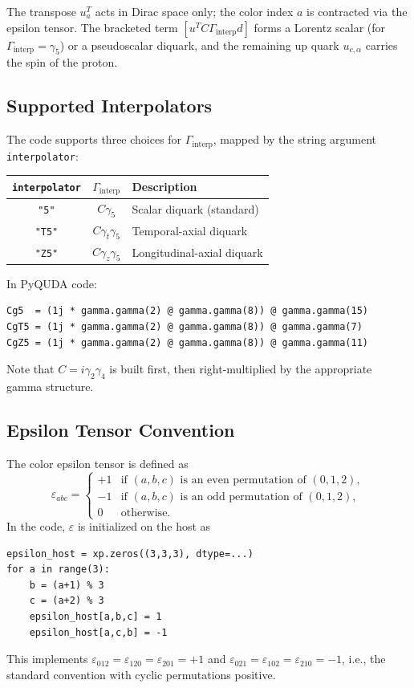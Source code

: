 \documentclass[11pt,a4paper]{article}
\newcommand{\eps}{\varepsilon}
\newcommand{\Gint}{\Gamma_{\text{interp}}}
\newcommand{\Cmat}{C}
\begin{document}
The transpose $u_{a}^{T}$ acts in Dirac space only; the color index $a$ is
contracted via the epsilon tensor.  The bracketed term $[u^{T}\Cmat\Gint d]$
forms a Lorentz scalar (for $\Gint = \gamma_{5}$) or a pseudoscalar diquark, and
the remaining up quark $u_{c,\alpha}$ carries the spin of the proton.

\subsection{Supported Interpolators}

The code supports three choices for $\Gint$, mapped by the string argument
\texttt{interpolator}:

\begin{center}
\begin{tabular}{ccl}
\toprule
\texttt{interpolator} & $\Gint$ & Description \\
\midrule
\texttt{"5"}  & $\Cmat\gamma_{5}$   & Scalar diquark (standard) \\
\texttt{"T5"} & $\Cmat\gamma_{t}\gamma_{5}$ & Temporal-axial diquark \\
\texttt{"Z5"} & $\Cmat\gamma_{z}\gamma_{5}$ & Longitudinal-axial diquark \\
\bottomrule
\end{tabular}
\end{center}

In PyQUDA code:
\begin{verbatim}
Cg5  = (1j * gamma.gamma(2) @ gamma.gamma(8)) @ gamma.gamma(15)
CgT5 = (1j * gamma.gamma(2) @ gamma.gamma(8)) @ gamma.gamma(7)
CgZ5 = (1j * gamma.gamma(2) @ gamma.gamma(8)) @ gamma.gamma(11)
\end{verbatim}
Note that $\Cmat = i\gamma_{2}\gamma_{4}$ is built first,
then right-multiplied by the appropriate gamma structure.

\subsection{Epsilon Tensor Convention}

The color epsilon tensor is defined as
\begin{equation}
  \eps_{abc} = \begin{cases}
    +1 & \text{if }(a,b,c)\text{ is an even permutation of }(0,1,2),\\
    -1 & \text{if }(a,b,c)\text{ is an odd permutation of }(0,1,2),\\
    0  & \text{otherwise}.
  \end{cases}
\end{equation}
In the code, $\eps$ is initialized on the host as
\begin{verbatim}
epsilon_host = xp.zeros((3,3,3), dtype=...)
for a in range(3):
    b = (a+1) % 3
    c = (a+2) % 3
    epsilon_host[a,b,c] = 1
    epsilon_host[a,c,b] = -1
\end{verbatim}
This implements $\eps_{012} = \eps_{120} = \eps_{201} = +1$ and
$\eps_{021} = \eps_{102} = \eps_{210} = -1$, i.e., the standard convention
with cyclic permutations positive.
\end{document}
